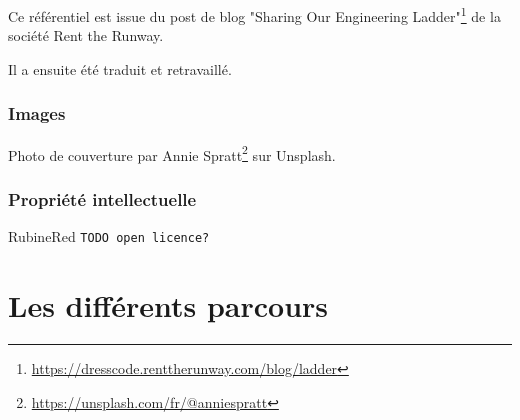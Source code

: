 \documentclass[a4paper, french, openany, 12pt]{book}
\newcommand{\fullwidthimage}[1]{
  \begin{center}
    \makebox[\textwidth]{\texttt{[image: \#1]}}
  \end{center}
}
\newcommand{\todo}[1]{
  \begin{color}{RubineRed}
    \texttt{TODO {#1}}
  \end{color}
}
\begin{document}
\begin{multicols}{2}
  Ce référentiel est issue du post de blog 
  "Sharing Our Engineering Ladder"\footnote{\url{https://dresscode.renttherunway.com/blog/ladder}}
  de la société Rent the Runway.
  
  Il a ensuite été traduit et retravaillé.
  
  \section*{Images}
  
  Photo de couverture par Annie Spratt\footnote{\url{https://unsplash.com/fr/@anniespratt}} sur Unsplash.
  
  \section*{Propriété intellectuelle}
  
  \todo{open licence?}
  
\end{multicols}
  
\mainmatter

\part{Les différents parcours}

\fullwidthimage{images/tracks.png}
\end{document}
